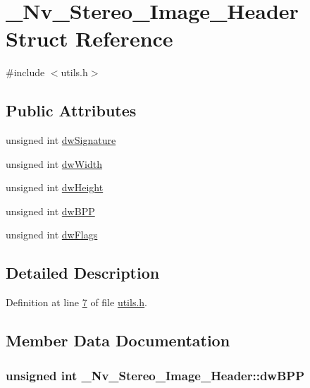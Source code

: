 \hypertarget{struct___nv___stereo___image___header}{
\section{\_\-Nv\_\-Stereo\_\-Image\_\-Header Struct Reference}
\label{struct___nv___stereo___image___header}
}


{\ttfamily \#include $<$utils.h$>$}

\subsection*{Public Attributes}
\begin{DoxyCompactItemize}
\item 
unsigned int \hyperlink{struct___nv___stereo___image___header_aac21b6be816ef3e6b98d1f1183263fd9}{dwSignature}
\item 
unsigned int \hyperlink{struct___nv___stereo___image___header_a495218c0378e538de8c3504daa0a0846}{dwWidth}
\item 
unsigned int \hyperlink{struct___nv___stereo___image___header_a72c1451aca7cb9c87540b647d51b25ad}{dwHeight}
\item 
unsigned int \hyperlink{struct___nv___stereo___image___header_a9a51ead5061c21601c50b0e1ee2be9a0}{dwBPP}
\item 
unsigned int \hyperlink{struct___nv___stereo___image___header_ad99da98f0c7e667408c3bba51ff5d047}{dwFlags}
\end{DoxyCompactItemize}


\subsection{Detailed Description}


Definition at line \hyperlink{utils_8h_source_l00007}{7} of file \hyperlink{utils_8h_source}{utils.h}.



\subsection{Member Data Documentation}
\hypertarget{struct___nv___stereo___image___header_a9a51ead5061c21601c50b0e1ee2be9a0}{
\subsubsection[{dwBPP}]{\setlength{\rightskip}{0pt plus 5cm}unsigned int {\bf \_\-Nv\_\-Stereo\_\-Image\_\-Header::dwBPP}}}
\label{struct___nv___stereo___image___header_a9a51ead5061c21601c50b0e1ee2be9a0}


